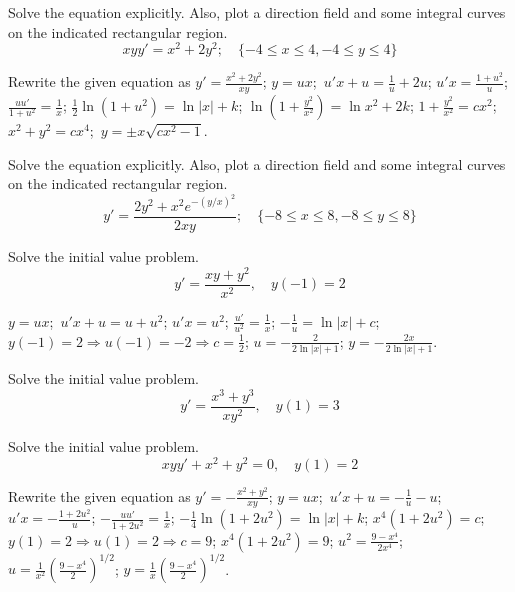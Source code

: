 \documentclass{ximera}
\begin{document}
\begin{problem}\label{exer:2.4.20} Solve the equation explicitly.  Also, plot a direction field and some integral curves on the indicated rectangular region.
$$xyy'=x^2+2y^2;  \quad \{-4\leq x\leq 4,-4\leq y\leq 4\}$$



\begin{solution}
    Rewrite the given equation as $y'=\frac{x^2+2y^2}{ xy}$;\;
$y=ux$;\ $u'x+u=\frac{1}{ u}+2u$;\;
$u'x=\frac{1+u^2}{ u}$;\;
$\frac{uu'}{1+u^2}=\frac{1}{ x}$;\;
$\frac{1}{2}\ln(1+u^2)=\ln|x|+k$;\;
$\ln\left(1+\frac{y^2}{ x^2}\right)=\ln x^2+2k$;\;
$1+\frac{y^2}{ x^2}=cx^2$;\;
$x^2+y^2=cx^4$;\ $y=\pm x\sqrt{cx^2-1}$.
\end{solution}
\end{problem}

\begin{problem}\label{exer:2.4.21} Solve the equation explicitly.  Also, plot a direction field and some integral curves on the indicated rectangular region.
$$y'=\frac{2y^2+x^2e^{-(y/x)^2}}{2xy};
\quad  \{-8\leq x\leq 8,-8\leq y\leq 8\}$$
\end{problem}

\begin{problem}\label{exer:2.4.22} Solve the initial value problem.
$$y'=\frac{xy+y^2}{x^2},
\quad y(-1)=2$$



\begin{solution}
    $y=ux$;\ $u'x+u=u+u^2$;\;
$u'x=u^2$;\;
$\frac{u'}{ u^2}=\frac{1}{ x}$;\;
$-\frac{1}{ u}=\ln|x|+c$;\;
$y(-1)=2\Rightarrow u(-1)=-2\Rightarrow c=\frac{1}{2}$;\;
$u=-\frac{2}{2\ln|x|+1}$;\;
$y=-\frac{2x}{2\ln|x|+1}$.
\end{solution}
\end{problem}

 \begin{problem}\label{exer:2.4.23} Solve the initial value problem.
 $$y'=\frac{x^3+y^3}{xy^2}, \quad y(1)=3$$
 \end{problem}

 \begin{problem}\label{exer:2.4.24} Solve the initial value problem.
 $$xyy'+x^2+y^2=0, \quad y(1)=2$$

 

 \begin{solution}
     Rewrite the given equation as $y'=-\frac{x^2+y^2}{ xy}$;\;
$y=ux$;\ $u'x+u=-\frac{1}{ u}-u$;\;
$u'x=-\frac{1+2u^2}{ u}$;\;
$-\frac{uu'}{1+2u^2}=\frac{1}{ x}$;\;
$-\frac{1}{4}\ln(1+2u^2)=\ln|x|+k$;\;
$x^4(1+2u^2)=c$;\;
$y(1)=2\Rightarrow u(1)=2\Rightarrow c=9$;\;
$x^4(1+2u^2)=9$;\;
$u^2=\frac{9-x^4}{2x^4}$;\;
$u=\frac{1}{ x^2}\left(\frac{9-x^4}{2}\right)^{1/2}$;\;
$y=\frac{1}{ x}\left(\frac{9-x^4}{2}\right)^{1/2}$.
 \end{solution}
 \end{problem}
\end{document}
